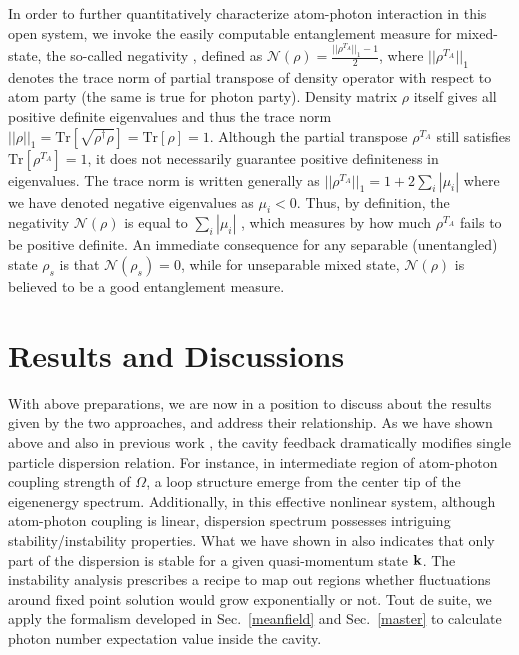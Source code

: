 \documentclass[atoms,article,submit,moreauthors,pdftex,12pt,a4paper]{mdpi}
\begin{document}
In order to further quantitatively characterize atom-photon interaction in this open system, we invoke the easily computable entanglement measure for mixed-state, the so-called negativity \cite{negativity}, defined as $\mathcal{N}(\rho)=\frac{||\rho^{T_A}||_1-1}{2}$, where $||\rho^{T_A}||_1$ denotes the trace norm of partial transpose of density operator with respect to atom party (the same is true for photon party). Density matrix $\rho$ itself gives all positive definite eigenvalues and thus the trace norm $||\rho||_1=\text{Tr}[\sqrt{\rho^\dagger\rho}]=\text{Tr}[\rho]=1$. Although the partial transpose $\rho^{T_A}$ still satisfies $\text{Tr}[\rho^{T_A}]=1$, it does not necessarily guarantee positive definiteness in eigenvalues. The trace norm is written generally as $||\rho^{T_A}||_1=1+2\sum_i|\mu_i|$ where we have denoted negative eigenvalues as $\mu_i<0$. Thus, by definition, the negativity $\mathcal{N}(\rho)$ is equal to $\sum_i|\mu_i|$ 
, which measures by how much $\rho^{T_A}$ fails to be positive definite. An immediate consequence for any separable (unentangled) state $\rho_s$ is that $\mathcal{N}(\rho_s)=0$, while for unseparable mixed state, $\mathcal{N}(\rho)$ is believed to be a good entanglement measure. 

\section{Results and Discussions} \label{relation}

With above preparations, we are now in a position to discuss about the results given by the two approaches, and address their relationship. As we have shown above and also in previous work \cite{cavitySOC}, the cavity feedback dramatically modifies single particle dispersion relation. For instance, in intermediate region of atom-photon coupling strength of $\Omega$, a loop structure emerge from the center tip of the eigenenergy spectrum. Additionally, in this effective nonlinear system, although atom-photon coupling is linear, dispersion spectrum possesses intriguing stability/instability properties. What we have shown in \cite{cavitySOC} also indicates that only part of the dispersion is stable for a given quasi-momentum state ${\bf k}$. The instability analysis prescribes a recipe to map out regions whether fluctuations around fixed point solution would grow exponentially or not. Tout de suite, we apply the formalism developed in Sec.~\ref{meanfield} and Sec.~\ref{master} to calculate photon number expectation value inside the cavity.
\end{document}
